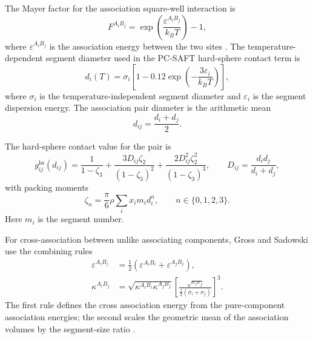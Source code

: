 \documentclass[12pt,letterpaper]{article}
\begin{document}
The Mayer factor for the association square-well interaction is
\begin{equation}
    F^{A_iB_j}
    =
    \exp\!\left(\frac{\varepsilon^{A_iB_j}}{k_B T}\right)-1 ,
    \label{eq:association_mayer_factor}
\end{equation}
where \(\varepsilon^{A_iB_j}\) is the association energy between the two sites
\cite{Chapman1990,Huang1990,Gross2002}. The temperature-dependent segment
diameter used in the PC-SAFT hard-sphere contact term is
\begin{equation}
    d_i(T)
    =
    \sigma_i
    \left[
        1-0.12\exp\!\left(-\frac{3\varepsilon_i}{k_B T}\right)
    \right],
    \label{eq:segment_diameter_temperature}
\end{equation}
where \(\sigma_i\) is the temperature-independent segment diameter and
\(\varepsilon_i\) is the segment dispersion energy. The association pair
diameter is the arithmetic mean
\begin{equation}
    d_{ij}
    =
    \frac{d_i+d_j}{2}.
    \label{eq:association_pair_diameter}
\end{equation}

The hard-sphere contact value for the pair is
\begin{equation}
    g_{ij}^{\mathrm{hs}}(d_{ij})
    =
    \frac{1}{1-\zeta_3}
    +
    \frac{3D_{ij}\zeta_2}{(1-\zeta_3)^2}
    +
    \frac{2D_{ij}^{2}\zeta_2^{2}}{(1-\zeta_3)^3},
    \qquad
    D_{ij}=\frac{d_id_j}{d_i+d_j},
    \label{eq:hard_sphere_contact_value}
\end{equation}
with packing moments
\begin{equation}
    \zeta_n
    =
    \frac{\pi}{6}\rho\sum_i x_i m_i d_i^n,
    \qquad n\in\{0,1,2,3\}.
    \label{eq:packing_moments}
\end{equation}
Here \(m_i\) is the segment number.

For cross-association between unlike associating components, Gross and Sadowski
use the combining rules
\begin{align}
    \varepsilon^{A_iB_j}
    &=
    \frac{1}{2}
    \left(
        \varepsilon^{A_iB_i}
        +
        \varepsilon^{A_jB_j}
    \right),
    \label{eq:association_energy_mixing}
    \\
    \kappa^{A_iB_j}
    &=
    \sqrt{\kappa^{A_iB_i}\kappa^{A_jB_j}}
    \left[
        \frac{\sqrt{\sigma_i\sigma_j}}
        {\frac{1}{2}(\sigma_i+\sigma_j)}
    \right]^3 .
    \label{eq:association_volume_mixing}
\end{align}
The first rule defines the cross association energy from the pure-component
association energies; the second scales the geometric mean of the association
volumes by the segment-size ratio \cite{Gross2002}.
\end{document}
